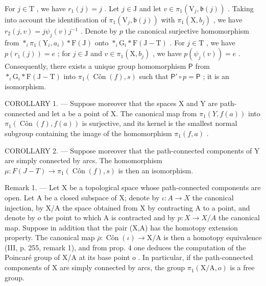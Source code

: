 For \(j \in \mathrm{T}\) , we have \(r_1(j) = j\) . Let \(j \in \mathrm{J}\) and let \(v \in \pi_1(\mathrm{V}_j, \mathfrak{b}(j))\) . Taking into account the identification of \(\pi_1(\mathrm{V}_j, \mathfrak{b}(j))\) with \(\pi_1(\mathrm{X}, b_j)\) , we have \(r_2(j, v) = j\psi_j(v)j^{-1}\) . Denote by \(p\) the canonical surjective homomorphism from \(*_{i}\pi_1(\mathrm{Y}_i, a_i) * \mathrm{F}(\mathrm{J})\) onto \(*_{i}\mathrm{G}_{i} * \mathrm{F}(\mathrm{J} - \mathrm{T})\) . For \(j \in \mathrm{T}\) , we have \(p(r_1(j)) = e\) ; for \(j \in \mathrm{J}\) and \(v \in \pi_1(\mathrm{X}, b_j)\) , we have \(p(\psi_j(v)) = e\) . Consequently, there exists a unique group homomorphism \(\mathsf{P}\) from \(*_{i}\mathrm{G}_{i} * \mathrm{F}(\mathrm{J} - \mathrm{T})\) into \(\pi_1(\operatorname{Côn}(f), s)\) such that \(\mathsf{P}' \circ p = \mathsf{P}\) ; it is an isomorphism.

COROLLARY 1. --- Suppose moreover that the spaces X and Y are path-connected and let a be a point of X. The canonical map from \(\pi_1(Y, f(a))\) into \(\pi_1(\operatorname{Côn}(f), f(a))\) is surjective, and its kernel is the smallest normal subgroup containing the image of the homomorphism \(\pi_1(f, a)\) .

COROLLARY 2. --- Suppose moreover that the path-connected components of Y are simply connected by arcs. The homomorphism \(\mu\colon F(J-T)\to\pi_{1}(\operatorname{Côn}(f),s)\) is then an isomorphism.

Remark 1. --- Let X be a topological space whose path-connected components are open. Let A be a closed subspace of X; denote by \(\iota\colon A\to X\) the canonical injection, by X/A the space obtained from X by contracting A to a point, and denote by \(o\) the point to which A is contracted and by \(p\colon X\to X / A\) the canonical map. Suppose in addition that the pair (X,A) has the homotopy extension property. The canonical map \(\overline{\rho}\colon \operatorname{Côn}(\iota)\to \mathrm{X} / \mathrm{A}\) is then a homotopy equivalence (III, p. 255, remark 1), and from prop. 4 one deduces the computation of the Poincaré group of X/A at its base point \(o\) . In particular, if the path-connected components of X are simply connected by arcs, the group \(\pi_1(\mathrm{X / A},o)\) is a free group.
\relax{}

